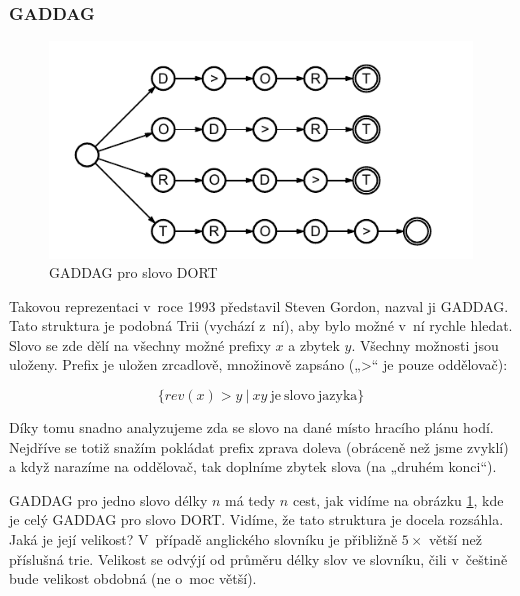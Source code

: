 \documentclass[a4paper]{article}
\begin{document}
\subsubsection{GADDAG}
 \begin{figure}[hb]
 \centering
\includegraphics{pic/gaddag-dort.pdf}
\caption{GADDAG pro slovo DORT}
\label{gaddag-dort}
\end{figure}
Takovou reprezentaci v~roce 1993 představil Steven Gordon, nazval ji GADDAG. Tato struktura je podobná Trii (vychází z~ní), aby bylo možné v~ní rychle hledat. Slovo se zde dělí na všechny možné prefixy $x$ a zbytek $y$. Všechny možnosti jsou uloženy. Prefix je uložen zrcadlově, množinově zapsáno („>“ je pouze oddělovač):

$$\{ rev(x)>y\ |\ xy \mathrm{\ je\ slovo\ jazyka}\}$$

Díky tomu snadno analyzujeme zda se slovo na dané místo hracího plánu hodí. Nejdříve se totiž snažím pokládat prefix zprava doleva (obráceně než jsme zvyklí) a když narazíme na oddělovač, tak doplníme zbytek slova (na „druhém konci“). 

GADDAG pro jedno slovo délky $n$ má tedy $n$ cest, jak vidíme na obrázku \ref{gaddag-dort}, kde je celý GADDAG pro slovo DORT. Vidíme, že tato struktura je docela rozsáhla. Jaká je její velikost? V~případě anglického slovníku je přibližně $5\times$ větší než příslušná trie. Velikost se odvýjí od průměru délky slov ve slovníku, čili v~češtině bude velikost obdobná (ne o~moc větší).
\end{document}
